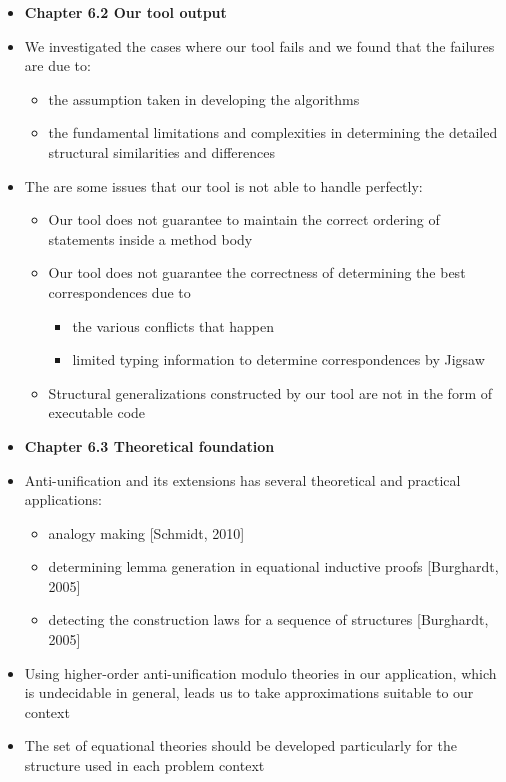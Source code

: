 \documentclass{article}
\newcommand{\bold}{\textbf}
\begin{document}
\begin{itemize} [leftmargin=.1in]
\item \bold{Chapter 6.2 Our tool output}
\item We investigated the cases where our tool fails and we found that the failures are due to:
\begin{itemize}
\item the assumption taken in developing the algorithms
\item the fundamental limitations and complexities in determining the detailed structural similarities and differences
\end{itemize}

\item The are some issues that our tool is not able to handle perfectly:
\begin{itemize}
\item Our tool does not guarantee to maintain the correct ordering of statements inside a method body
\item Our tool does not guarantee the correctness of determining the best correspondences due to
\begin{itemize}
\item the various conflicts that happen
\item limited typing information to determine correspondences by Jigsaw
\end{itemize}
\item Structural generalizations constructed by our tool are not in the form of executable code
\end{itemize}
\item \bold{Chapter 6.3 Theoretical foundation}
\item Anti-unification and its extensions has several theoretical and practical applications:
\begin{itemize}
\item analogy making [Schmidt, 2010]
\item determining lemma generation in equational inductive proofs [Burghardt, 2005]
\item detecting the construction laws for a sequence of structures [Burghardt, 2005]
\end{itemize}
\item Using higher-order anti-unification modulo theories in our application, which is undecidable in general, leads us to take approximations suitable to our context
\item The set of equational theories should be developed particularly for the structure used in each problem context


\end{itemize}
\end{document}
